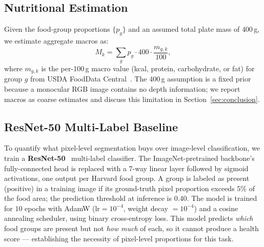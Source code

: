 \subsection{Nutritional Estimation}
Given the food-group proportions $\{p_g\}$ and an assumed total plate mass of $400\,$g, we estimate aggregate macros as:
\begin{equation}
    M_k = \sum_g p_g \cdot 400 \cdot \frac{m_{g,k}}{100},
\end{equation}
where $m_{g,k}$ is the per-100\,g macro value (kcal, protein, carbohydrate, or fat) for group $g$ from USDA FoodData Central~\cite{usdafdc}.
The $400\,$g assumption is a fixed prior because a monocular RGB image contains no depth information; we report macros as coarse estimates and discuss this limitation in Section~\ref{sec:conclusion}.

\subsection{ResNet-50 Multi-Label Baseline}
To quantify what pixel-level segmentation buys over image-level classification, we train a \textbf{ResNet-50}~\cite{he2016resnet} multi-label classifier.
The ImageNet-pretrained backbone's fully-connected head is replaced with a 7-way linear layer followed by sigmoid activations, one output per Harvard food group.
A group is labeled as present (positive) in a training image if its ground-truth pixel proportion exceeds $5\%$ of the food area; the prediction threshold at inference is $0.40$.
The model is trained for $10$ epochs with AdamW ($\text{lr}=10^{-4}$, weight decay $= 10^{-4}$) and a cosine annealing scheduler, using binary cross-entropy loss.
This model predicts \emph{which} food groups are present but not \emph{how much} of each, so it cannot produce a health score --- establishing the necessity of pixel-level proportions for this task.
